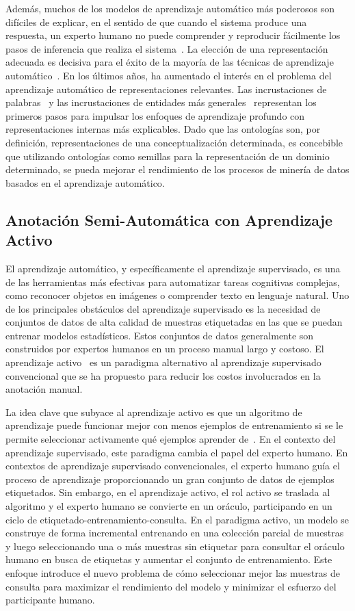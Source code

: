 Además, muchos de los modelos de aprendizaje automático más poderosos son difíciles de explicar, en el sentido de que cuando el sistema produce una respuesta, un experto humano no puede comprender y reproducir fácilmente los pasos de inferencia que realiza el sistema~\cite{olden2002illuminating}. La elección de una representación adecuada es decisiva para el éxito de la mayoría de las técnicas de aprendizaje automático~\cite{bengio2012deep}. En los últimos años, ha aumentado el interés en el problema del aprendizaje automático de representaciones relevantes. Las incrustaciones de palabras~\cite{mikolov} y las incrustaciones de entidades más generales~\cite{hu2015entity} representan los primeros pasos para impulsar los enfoques de aprendizaje profundo con representaciones internas más explicables. Dado que las ontologías son, por definición, representaciones de una conceptualización determinada, es concebible que utilizando ontologías como semillas para la representación de un dominio determinado, se pueda mejorar el rendimiento de los procesos de minería de datos basados en el aprendizaje automático.

\subsection{Anotación Semi-Automática con Aprendizaje Activo}

El aprendizaje automático, y específicamente el aprendizaje supervisado, es una de las herramientas más efectivas para automatizar tareas cognitivas complejas, como reconocer objetos en imágenes o comprender texto en lenguaje natural. Uno de los principales obstáculos del aprendizaje supervisado es la necesidad de conjuntos de datos de alta calidad de muestras etiquetadas en las que se puedan entrenar modelos estadísticos. Estos conjuntos de datos generalmente son construidos por expertos humanos en un proceso manual largo y costoso. El aprendizaje activo~\cite{Cohn2010ActiveL} es un paradigma alternativo al aprendizaje supervisado convencional que se ha propuesto para reducir los costos involucrados en la anotación manual.

La idea clave que subyace al aprendizaje activo es que un algoritmo de aprendizaje puede funcionar mejor con menos ejemplos de entrenamiento si se le permite seleccionar activamente qué ejemplos aprender de~\cite{seungquery}.
En el contexto del aprendizaje supervisado, este paradigma cambia el papel del experto humano.
En contextos de aprendizaje supervisado convencionales, el experto humano guía el proceso de aprendizaje proporcionando un gran conjunto de datos de ejemplos etiquetados. Sin embargo, en el aprendizaje activo, el rol activo se traslada al algoritmo y el experto humano se convierte en un oráculo, participando en un ciclo de etiquetado-entrenamiento-consulta.
En el paradigma activo, un modelo se construye de forma incremental entrenando en una colección parcial de muestras y luego seleccionando una o más muestras sin etiquetar para consultar el oráculo humano en busca de etiquetas y aumentar el conjunto de entrenamiento.
Este enfoque introduce el nuevo problema de cómo seleccionar mejor las muestras de consulta para maximizar el rendimiento del modelo y minimizar el esfuerzo del participante humano.

